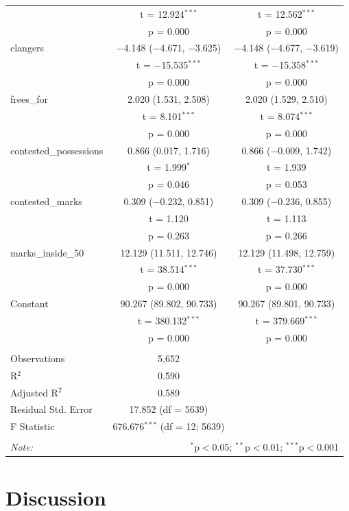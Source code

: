 \documentclass{article}
\begin{document}
\begin{table}[!htbp]
\begin{tabular}{@{\extracolsep{5pt}}lcc}
  & t = 12.924$^{***}$ & t = 12.562$^{***}$ \\ 
  & p = 0.000 & p = 0.000 \\ 
  clangers & $-$4.148 ($-$4.671, $-$3.625) & $-$4.148 ($-$4.677, $-$3.619) \\ 
  & t = $-$15.535$^{***}$ & t = $-$15.358$^{***}$ \\ 
  & p = 0.000 & p = 0.000 \\ 
  frees\_for & 2.020 (1.531, 2.508) & 2.020 (1.529, 2.510) \\ 
  & t = 8.101$^{***}$ & t = 8.074$^{***}$ \\ 
  & p = 0.000 & p = 0.000 \\ 
  contested\_possessions & 0.866 (0.017, 1.716) & 0.866 ($-$0.009, 1.742) \\ 
  & t = 1.999$^{*}$ & t = 1.939 \\ 
  & p = 0.046 & p = 0.053 \\ 
  contested\_marks & 0.309 ($-$0.232, 0.851) & 0.309 ($-$0.236, 0.855) \\ 
  & t = 1.120 & t = 1.113 \\ 
  & p = 0.263 & p = 0.266 \\ 
  marks\_inside\_50 & 12.129 (11.511, 12.746) & 12.129 (11.498, 12.759) \\ 
  & t = 38.514$^{***}$ & t = 37.730$^{***}$ \\ 
  & p = 0.000 & p = 0.000 \\ 
  Constant & 90.267 (89.802, 90.733) & 90.267 (89.801, 90.733) \\ 
  & t = 380.132$^{***}$ & t = 379.669$^{***}$ \\ 
  & p = 0.000 & p = 0.000 \\ 
 \hline \\[-1.8ex] 
Observations & 5,652 &  \\ 
R$^{2}$ & 0.590 &  \\ 
Adjusted R$^{2}$ & 0.589 &  \\ 
Residual Std. Error & 17.852 (df = 5639) &  \\ 
F Statistic & 676.676$^{***}$ (df = 12; 5639) &  \\ 
\hline 
\hline \\[-1.8ex] 
\textit{Note:}  & \multicolumn{2}{r}{$^{*}$p$<$0.05; $^{**}$p$<$0.01; $^{***}$p$<$0.001} \\ 
\end{tabular} 
\end{table}

\hypertarget{discussion}{%
\section{Discussion}\label{discussion}}
\end{document}
